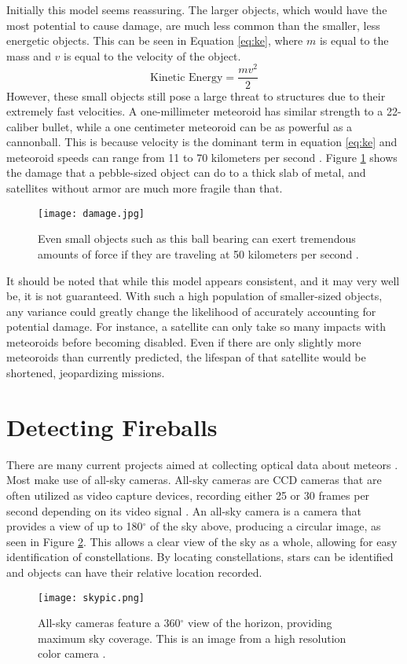 Initially this model seems reassuring. The larger objects, which would have the most  potential to cause damage, are much less common than the smaller, less energetic objects. This can be seen in Equation \ref{eq:ke}, where $m$ is equal to the mass and $v$ is equal to the velocity of the object.
\begin{equation} \label{eq:ke}
	\textrm{Kinetic Energy} = \frac{mv^2}{2}
\end{equation}
However, these small objects still pose a large threat to structures due to their extremely fast velocities. A one-millimeter meteoroid has similar strength to a 22-caliber bullet, while a one centimeter meteoroid can be as powerful as a cannonball. This is because velocity is the dominant term in equation \ref{eq:ke} and meteoroid speeds can range from 11 to 70 kilometers per second \cite{Harbaugh2008}. Figure \ref{fig:damage} shows the damage that a pebble-sized object can do to a thick slab of metal, and satellites without armor are much more fragile than that.

\begin{figure}[ht!]
  \centering
  \texttt{[image: damage.jpg]}
  \caption{Even small objects such as this ball bearing can exert tremendous amounts of force if they are traveling at 50 kilometers per second \protect\cite{ESA2017}.}
  \label{fig:damage}
\end{figure}


It should be noted that while this model appears consistent, and it may very well be, it is not guaranteed. With such a high population of smaller-sized objects, any variance could greatly change the likelihood of accurately accounting for potential damage. For instance, a satellite can only take so many impacts with meteoroids before becoming disabled. Even if there are only slightly more meteoroids than currently predicted, the lifespan of that satellite would be shortened, jeopardizing missions. 

\section{Detecting Fireballs}
There are many current projects aimed at collecting optical data about meteors \cite{Jenniskens2011,Trigo-Rodriguez2007,Halliday1996}. Most make use of all-sky cameras. All-sky cameras are CCD cameras that are often utilized as video capture devices, recording either 25 or 30 frames per second depending on its video signal \cite{Molau2005}. An all-sky camera is a camera that provides a view of up to 180$^{\circ}$ of the sky above, producing a circular image, as seen in Figure \ref{fig:skypic}. This allows a clear view of the sky as a whole, allowing for easy identification of constellations. By locating constellations, stars can be identified and objects can have their relative location recorded. 
\begin{figure}[ht!]
  \centering
  \texttt{[image: skypic.png]}
  \caption{All-sky cameras feature a 360$^{\circ}$ view of the horizon, providing maximum sky coverage. This is an image from a high resolution color camera \protect\cite{Alcor}.}
  \label{fig:skypic}
\end{figure}

